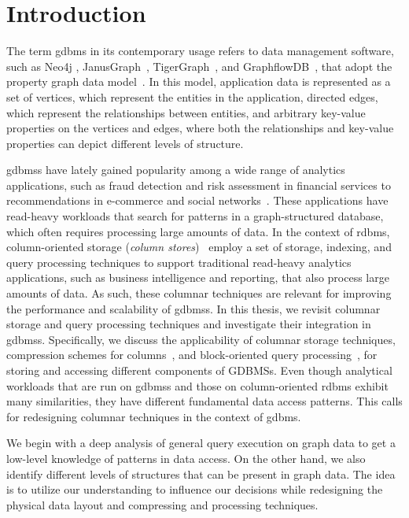 
\chapter{Introduction}
\label{introduction}

The term \gls{gdbms} in its contemporary usage refers to data management software, such as Neo4j \cite{neo4j}, JanusGraph~\cite{janusgraph}, TigerGraph~\cite{tigergraph}, and GraphflowDB~\cite{kankanamge:graphflow, mhedhbi:sqs}, that adopt the property graph data model~\cite{neo4j-property-graph-model}. In this model, application data is represented as a set of vertices, which represent the entities in the application, directed edges, which represent the relationships between entities, and arbitrary key-value properties on the vertices and edges, where both the relationships and key-value properties can depict different levels of structure.

\gls{gdbms}s have lately gained popularity among a wide range of analytics applications, such as fraud detection and risk assessment in financial services to recommendations in e-commerce and social networks~\cite{sahu:survey}. These applications have read-heavy workloads that search for patterns in a graph-structured database, which often requires processing large amounts of data. In the context of \gls{rdbms}, column-oriented storage ({\em column stores})~\cite{c-store, monetdb, boncz-vectorwise, oracle-col} employ a set of storage, indexing, and query processing techniques to support traditional read-heavy analytics applications, such as business intelligence and reporting, that also process large amounts of data. As such, these columnar techniques are relevant for improving the performance and scalability of \gls{gdbms}s. In this thesis, we revisit columnar storage and query processing techniques and investigate their integration in \gls{gdbms}s. Specifically, we discuss the applicability of columnar storage techniques, compression schemes for columns~\cite{abadi-col-comp, abadi-sparse-col, boncz-comp}, and block-oriented query processing~\cite{boncz-monet-vectorized, col-vs-row}, for storing and accessing different components of GDBMSs. Even though analytical workloads that are run on \gls{gdbms}s and those on column-oriented \gls{rdbms} exhibit many similarities, they have different fundamental data access patterns. This calls for redesigning columnar techniques in the context of \gls{gdbms}.

We begin with a deep analysis of general query execution on graph data to get a low-level knowledge of patterns in data access. On the other hand, we also identify different levels of structures that can be present in graph data. The idea is to utilize our understanding to influence our decisions while redesigning the physical data layout and compressing and processing techniques. 


